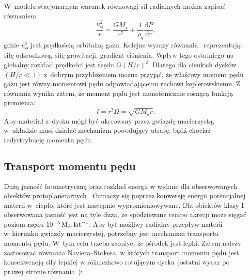 %
\par W~modelu stacjonarnym warunek równowagi sił radialnych można zapisać
równaniem:
%
\begin{equation}\label{eq:radial_balance}
\frac{u_\phi^2}{r} = \frac{GM_\star}{r^2} +
  \frac{1}{\rho_g}\frac{\textrm{d}P}{\textrm{dr}},
\end{equation}
gdzie $u_\phi^2$ jest prędkością orbitalną gazu.  Kolejne wyrazy
równania~ reprezentują: siłę odśrodkową, siłę
grawitacji, gradient ciśnienia. Wpływ tego ostatniego na globalny rozkład
prędkości jest rzędu $O(H/r)^2$. Dlatego dla cienkich dysków $(H/r \ll 1)$
z~dobrym przybliżeniem można przyjąć, że właściwy moment pędu gazu jest równy
momentowi pędu odpowiadającemu ruchowi keplerowskiemu. Z równania
 wynika zatem, że moment pędu jest monotonicznie rosnącą
funkcją promienia:
%
\begin{equation}\label{eq:angmom}
l = r^2\Omega = \sqrt{GM_\star r}.
\end{equation}
%
Aby materiał z~dysku mógł być akreowany przez gwiazdę macierzystą, w~układzie
musi działać mechanizm powodujący utratę, bądź chociaż redystrybucję momentu
pędu.

\subsection{Transport momentu pędu}
Dużą jasność fotometryczną oraz rozkład energii w widmie dla obserwowanych
obiektów protoplanetarnych~\citep{MME04} tłumaczy się poprzez konwersję energii
potencjalnej materii w~ciepło, które jest następnie wypromieniowywane. Dla
obiektów klasy I obserwowana jasność jest na tyle duża, że spodziewane tempo
akrecji może sięgać poziom rzędu $10^{-5}\hbox{$\mathrm{\thinspace M_{\odot}}$}\hbox{$\thinspace\textrm{lat}$}^{-1}$.  Aby był możliwy radialny
przepływ materii w~kierunku gwiazdy macierzystej, potrzebny jest mechanizm
transportu momentu pędu. W~tym celu trzeba założyć, że ośrodek jest lepki. Zatem
należy zastosować równania Naviera--Stokesa, w których transport momentu pędu
jest konsekwencją siły lepkiej w różniczkowo rotującym dysku (ostatni wyraz po
prawej stronie równania~):

